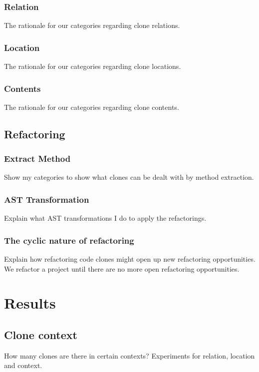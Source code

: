 \documentclass[conference]{IEEEtran}
\begin{document}
\subsubsection{Relation}
The rationale for our categories regarding clone relations.

\subsubsection{Location}
The rationale for our categories regarding clone locations.

\subsubsection{Contents}
The rationale for our categories regarding clone contents.

\subsection{Refactoring}
\subsubsection{Extract Method}
Show my categories to show what clones can be dealt with by method extraction.

\subsubsection{AST Transformation}
Explain what AST transformations I do to apply the refactorings.

\subsubsection{The cyclic nature of refactoring}
Explain how refactoring code clones might open up new refactoring opportunities. We refactor a project until there are no more open refactoring opportunities.

\section{Results}

\subsection{Clone context}
How many clones are there in certain contexts? Experiments for relation, location and context.
\end{document}
